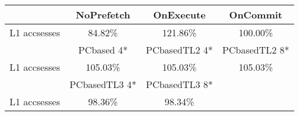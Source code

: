 \begin{tabular}{ l|ccc }
 & NoPrefetch & OnExecute & OnCommit\\ \hline
L1 accsesses & 84.82\% & 121.86\% & 100.00\%\\ \hline
\hline
 & PCbased 4* & PCbasedTL2 4* & PCbasedTL2 8*\\ \hline
L1 accsesses & 105.03\% & 105.03\% & 105.03\%\\ \hline
\hline
 & PCbasedTL3 4* & PCbasedTL3 8*&\\ \hline
L1 accsesses & 98.36\% & 98.34\%&\\ \hline
\end{tabular}

